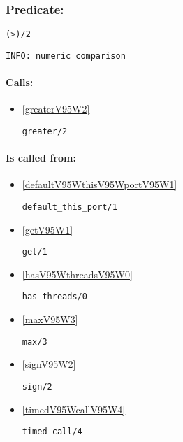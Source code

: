 \subsubsection{Predicate:} \label{V62WV95W2}

\begin{verbatim}
(>)/2
\end{verbatim}

{\small \begin{verbatim}
INFO: numeric comparison

\end{verbatim}}
\paragraph{Calls:} 
\begin{itemize}
\item \ref{greaterV95W2} 
\begin{verbatim}
greater/2
\end{verbatim}

\end{itemize}
\paragraph{Is called from:} 
\begin{itemize}
\item \ref{defaultV95WthisV95WportV95W1} 
\begin{verbatim}
default_this_port/1
\end{verbatim}

\item \ref{getV95W1} 
\begin{verbatim}
get/1
\end{verbatim}

\item \ref{hasV95WthreadsV95W0} 
\begin{verbatim}
has_threads/0
\end{verbatim}

\item \ref{maxV95W3} 
\begin{verbatim}
max/3
\end{verbatim}

\item \ref{signV95W2} 
\begin{verbatim}
sign/2
\end{verbatim}

\item \ref{timedV95WcallV95W4} 
\begin{verbatim}
timed_call/4
\end{verbatim}

\end{itemize}


